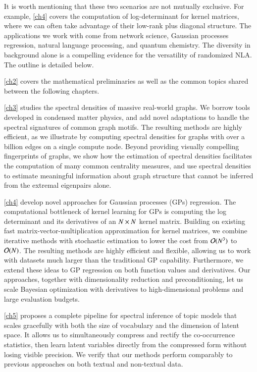 It is worth mentioning that these two scenarios are not mutually exclusive. For
example, \cref{ch4} covers the computation of log\hyp{}determinant for kernel
matrices, where we can often take advantage of their low\hyp{}rank plus diagonal
structure. The applications we work with come from network science, Gaussian
processes regression, natural language processing, and quantum chemistry. The
diversity in background alone is a compelling evidence for the versatility of
randomized NLA. The outline is detailed below.

\cref{ch2} covers the mathematical preliminaries as well as the common topics
shared between the following chapters.

\cref{ch3} studies the spectral densities of massive real-world graphs. We
borrow tools developed in condensed matter physics, and add novel adaptations to
handle the spectral signatures of common graph motifs.  The resulting methods
are highly efficient, as we illustrate by computing spectral densities for
graphs with over a billion edges on a single compute node. Beyond providing
visually compelling fingerprints of graphs, we show how the  estimation of
spectral densities facilitates the computation of many common centrality
measures, and use spectral densities to estimate meaningful information about
graph structure that cannot be inferred from the extremal eigenpairs alone.

\cref{ch4} develop novel approaches for Gaussian processes (GPs) regression.
The computational bottleneck of kernel learning for GPs is computing the log
determinant and its derivatives of an $N\mathbin{\times} N$ kernel matrix. Building on
existing fast matrix-vector-multiplication approximation for kernel
matrices, we combine iterative methods with stochastic estimation to
lower the cost from $\mathcal{O}(N^3)$ to $\mathcal{O}(N)$. The resulting methods are highly
efficient and flexible, allowing us to work with datasets much larger than
the traditional GP capability. Furthermore, we extend these ideas to GP
regression on both function values and derivatives. Our approaches, together
with dimensionality reduction and preconditioning, let us scale Bayesian
optimization with derivatives to high\hyp{}dimensional problems and large
evaluation budgets.

\cref{ch5} proposes a complete pipeline for spectral inference of topic
models that scales gracefully with both the size of vocabulary and the dimension
of latent space. It allows us to simultaneously compress and rectify the 
co\hyp{}occurrence statistics, then learn latent variables directly from the
compressed form without losing visible precision. We verify that our
methods perform comparably to previous approaches on both textual and
non\hyp{}textual data.

